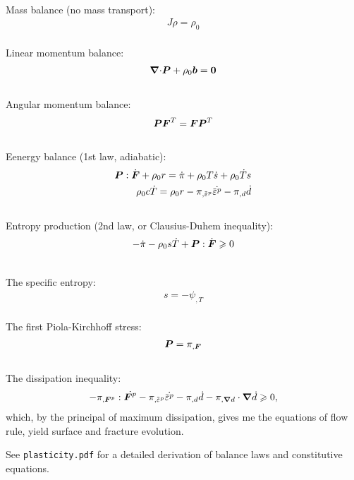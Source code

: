 \begin{frame}{}
 \\
Mass balance (no mass transport):
\begin{align}
    J\rho = \rho_0
\end{align} \\
Linear momentum balance:
\begin{align}
    {\boldsymbol{\nabla}\cdot} \boldsymbol{P} + \rho_0 \boldsymbol{b} = \boldsymbol{0}
\end{align} \\
Angular momentum balance:
\begin{align}
    \boldsymbol{P} \boldsymbol{F}^T = \boldsymbol{F} \boldsymbol{P}^T
\end{align} \\
Eenergy balance (1st law, adiabatic):
\begin{align}
    \bs{P} : \dot{\defgrad} + \rho_0 r = \dot{\pi} + \rho_0 T \dot{s} + \rho_0 \dot{T} s \\
    \rho_0 c \dot{T} = \rho_0 r - \pi_{, \plasticstrain}\dot{\plasticstrain} - \pi_{, d} \dot{d}
\end{align} \\
Entropy production (2nd law, or Clausius-Duhem inequality):
\begin{align}
    -\dot{\pi} - \rho_0 s \dot{T} + \boldsymbol{P} : \dot{\boldsymbol{F}} \geqslant 0
\end{align}
\end{frame}

\begin{frame}{}
 \\
The specific entropy:
\begin{align}
    s = -\psi_{, T}
\end{align} \\
The first Piola-Kirchhoff stress:
\begin{align}
    \boldsymbol{P} = \pi_{, \boldsymbol{F}}
\end{align} \\
The dissipation inequality:
\begin{align}
    - \pi_{, \defgrad^p} : \dot{\defgrad^p} - \pi_{, \plasticstrain}\dot{\plasticstrain} - \pi_{, d} \dot{d} - \pi_{, \grad d} \cdot \grad \dot{d} \geqslant 0,
\end{align}
which, by the principal of maximum dissipation, gives me the equations of flow rule, yield surface and fracture evolution. \\
\bigskip
\begin{exampleblock}{}
    See \texttt{plasticity.pdf} for a detailed derivation of balance laws and constitutive equations.
\end{exampleblock}
\end{frame}

